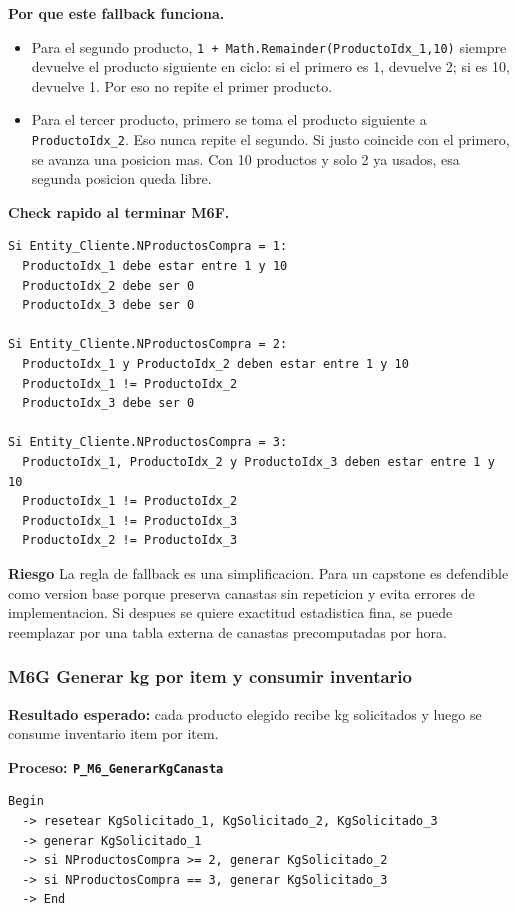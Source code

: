 \documentclass[11pt]{article}
\newcommand{\state}[1]{\texttt{#1}}
\newcommand{\proc}[1]{\texttt{#1}}
\newcommand{\risk}{\textcolor{rojoriesgo}{\textbf{Riesgo}}}
\begin{document}
\textbf{Por que este fallback funciona.}
\begin{itemize}
  \item Para el segundo producto, \state{1 + Math.Remainder(ProductoIdx\_1,10)} siempre devuelve el producto siguiente en ciclo: si el primero es 1, devuelve 2; si es 10, devuelve 1. Por eso no repite el primer producto.
  \item Para el tercer producto, primero se toma el producto siguiente a \state{ProductoIdx\_2}. Eso nunca repite el segundo. Si justo coincide con el primero, se avanza una posicion mas. Con 10 productos y solo 2 ya usados, esa segunda posicion queda libre.
\end{itemize}

\textbf{Check rapido al terminar M6F.}
\begin{lstlisting}[caption={Validacion minima de productos elegidos}]
Si Entity_Cliente.NProductosCompra = 1:
  ProductoIdx_1 debe estar entre 1 y 10
  ProductoIdx_2 debe ser 0
  ProductoIdx_3 debe ser 0

Si Entity_Cliente.NProductosCompra = 2:
  ProductoIdx_1 y ProductoIdx_2 deben estar entre 1 y 10
  ProductoIdx_1 != ProductoIdx_2
  ProductoIdx_3 debe ser 0

Si Entity_Cliente.NProductosCompra = 3:
  ProductoIdx_1, ProductoIdx_2 y ProductoIdx_3 deben estar entre 1 y 10
  ProductoIdx_1 != ProductoIdx_2
  ProductoIdx_1 != ProductoIdx_3
  ProductoIdx_2 != ProductoIdx_3
\end{lstlisting}

\risk{} La regla de fallback es una simplificacion. Para un capstone es defendible como version base porque preserva canastas sin repeticion y evita errores de implementacion. Si despues se quiere exactitud estadistica fina, se puede reemplazar por una tabla externa de canastas precomputadas por hora.

\subsubsection{M6G Generar kg por item y consumir inventario}
\textbf{Resultado esperado:} cada producto elegido recibe kg solicitados y luego se consume inventario item por item.

\textbf{Proceso: \proc{P\_M6\_GenerarKgCanasta}}

\begin{lstlisting}[caption={Diagrama de P M6 GenerarKgCanasta}]
Begin
  -> resetear KgSolicitado_1, KgSolicitado_2, KgSolicitado_3
  -> generar KgSolicitado_1
  -> si NProductosCompra >= 2, generar KgSolicitado_2
  -> si NProductosCompra == 3, generar KgSolicitado_3
  -> End
\end{lstlisting}
\end{document}
